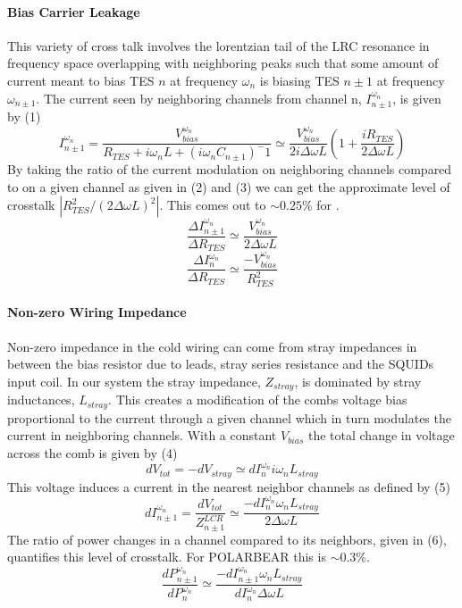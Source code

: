 \paragraph{Bias Carrier Leakage}
This variety of cross talk involves the lorentzian tail of the LRC resonance in frequency space overlapping with neighboring peaks such that some amount of current meant to bias TES $n$ at frequency $\omega_n$ is biasing TES $n\pm1$ at frequency $\omega_{n\pm1}$. The current seen by neighboring channels from channel n, $I^{\omega_n}_{n\pm1}$, is given by (1)
\begin{equation}
I^{\omega_n}_{n\pm1} = \frac{V^{\omega_n}_{bias}}{R_{TES}+i\omega_nL+(i\omega_nC_{n\pm1})^-1} \simeq \frac{V^{\omega_n}_{bias}}{2i\Delta\omega L}\left(1+\frac{iR_{TES}}{2\Delta\omega L}\right)
\end{equation}
By taking the ratio of the current modulation on neighboring channels compared to on a given channel as given in (2) and (3) we can get  the approximate level of crosstalk $|R^2_{TES}/(2\Delta \omega L)^2|$. This comes out to $\sim0.25\%$ for \pb.
\begin{equation}
\frac{\Delta I^{\omega_n}_{n\pm1}}{\Delta R_{TES}} \simeq \frac{V^{\omega_n}_{bias}}{2\Delta\omega L}
\end{equation}
\begin{equation}
\frac{\Delta I^{\omega_n}_{n}}{\Delta R_{TES}} \simeq \frac{-V^{\omega_n}_{bias}}{R^2_{TES}}
\end{equation}

\paragraph{Non-zero Wiring Impedance}
Non-zero impedance in the cold wiring can come from stray impedances in between the bias resistor due to leads, stray series resistance and the SQUIDs input coil. In our system the stray impedance, $Z_{stray}$, is dominated by stray inductances, $L_{stray}$. This creates a modification of the combs voltage bias proportional to the current through a given channel which in turn modulates the current in neighboring channels. With a constant $V_{bias}$ the total change in voltage across the comb is given by (4)
\begin{equation}
dV_{tot}=-dV_{stray}\simeq dI^{\omega_n}_{n}i\omega_nL_{stray}
\end{equation}
This voltage induces a current in the nearest neighbor channels as defined by (5)
\begin{equation}
dI^{\omega_n}_{n\pm1}=\frac{dV_{tot}}{Z^{LCR}_{n\pm1}}\simeq \frac{-dI^{\omega_n}_{n}\omega_nL_{stray}}{2\Delta \omega L}
\end{equation}
The ratio of power changes in a channel compared to its neighbors, given in (6), quantifies this level of crosstalk. For POLARBEAR this is $\sim0.3\%$.
\begin{equation}
\frac{dP^{\omega_n}_{n\pm1}}{dP^{\omega_n}_{n}}\simeq \frac{-dI^{\omega_n}_{n\pm1}\omega_nL_{stray}}{dI^{\omega_n}_{n}\Delta\omega L}
\end{equation}
